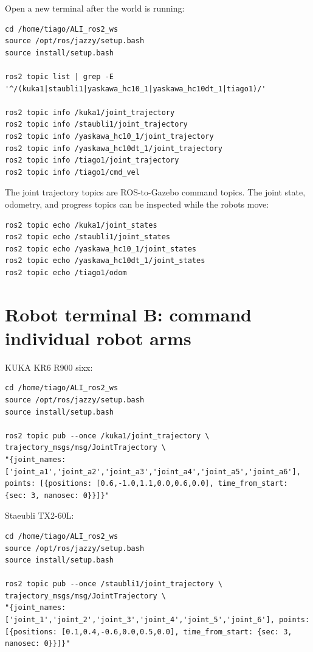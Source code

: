 \documentclass[12pt,a4paper]{report}
\begin{document}
Open a new terminal after the world is running:

\begin{lstlisting}[style=terminalcode]
cd /home/tiago/ALI_ros2_ws
source /opt/ros/jazzy/setup.bash
source install/setup.bash

ros2 topic list | grep -E '^/(kuka1|staubli1|yaskawa_hc10_1|yaskawa_hc10dt_1|tiago1)/'

ros2 topic info /kuka1/joint_trajectory
ros2 topic info /staubli1/joint_trajectory
ros2 topic info /yaskawa_hc10_1/joint_trajectory
ros2 topic info /yaskawa_hc10dt_1/joint_trajectory
ros2 topic info /tiago1/joint_trajectory
ros2 topic info /tiago1/cmd_vel
\end{lstlisting}

The joint trajectory topics are ROS-to-Gazebo command topics. The joint state,
odometry, and progress topics can be inspected while the robots move:

\begin{lstlisting}[style=terminalcode]
ros2 topic echo /kuka1/joint_states
ros2 topic echo /staubli1/joint_states
ros2 topic echo /yaskawa_hc10_1/joint_states
ros2 topic echo /yaskawa_hc10dt_1/joint_states
ros2 topic echo /tiago1/odom
\end{lstlisting}

\section{Robot terminal B: command individual robot arms}

KUKA KR6 R900 sixx:

\begin{lstlisting}[style=terminalcode]
cd /home/tiago/ALI_ros2_ws
source /opt/ros/jazzy/setup.bash
source install/setup.bash

ros2 topic pub --once /kuka1/joint_trajectory \
trajectory_msgs/msg/JointTrajectory \
"{joint_names: ['joint_a1','joint_a2','joint_a3','joint_a4','joint_a5','joint_a6'], points: [{positions: [0.6,-1.0,1.1,0.0,0.6,0.0], time_from_start: {sec: 3, nanosec: 0}}]}"
\end{lstlisting}

Staeubli TX2-60L:

\begin{lstlisting}[style=terminalcode]
cd /home/tiago/ALI_ros2_ws
source /opt/ros/jazzy/setup.bash
source install/setup.bash

ros2 topic pub --once /staubli1/joint_trajectory \
trajectory_msgs/msg/JointTrajectory \
"{joint_names: ['joint_1','joint_2','joint_3','joint_4','joint_5','joint_6'], points: [{positions: [0.1,0.4,-0.6,0.0,0.5,0.0], time_from_start: {sec: 3, nanosec: 0}}]}"
\end{lstlisting}
\end{document}
